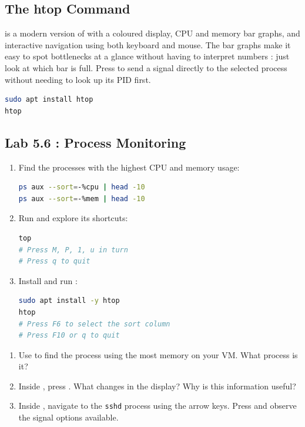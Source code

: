 \subsection{The htop Command}

 is a modern version of  with a coloured display, CPU and
memory bar graphs, and interactive navigation using both keyboard and mouse.
The bar graphs make it easy to spot bottlenecks at a glance without having to
interpret numbers : just look at which bar is full. Press  to
send a signal directly to the selected process without needing to look up its
PID first.

\begin{lstlisting}[language=bash, caption={Installing and using htop}]
sudo apt install htop
htop
\end{lstlisting}

\subsection*{Lab 5.6 : Process Monitoring}

\begin{enumerate}
  \item Find the processes with the highest CPU and memory usage:
\begin{lstlisting}[language=bash, caption={Processes with the highest resource usage}]
ps aux --sort=-%cpu | head -10
ps aux --sort=-%mem | head -10
\end{lstlisting}

  \item Run  and explore its shortcuts:
\begin{lstlisting}[language=bash, caption={Exploring top}]
top
# Press M, P, 1, u in turn
# Press q to quit
\end{lstlisting}

  \item Install and run :
\begin{lstlisting}[language=bash, caption={Using htop}]
sudo apt install -y htop
htop
# Press F6 to select the sort column
# Press F10 or q to quit
\end{lstlisting}
\end{enumerate}

\begin{exercisebox}[5.6]
  \begin{enumerate}
    \item Use  to find the process using the most
      memory on your VM. What process is it?
    \item Inside , press . What changes in the display?
      Why is this information useful?
    \item Inside , navigate to the \texttt{sshd} process using the
      arrow keys. Press  and observe the signal options
      available.
  \end{enumerate}
\end{exercisebox}


